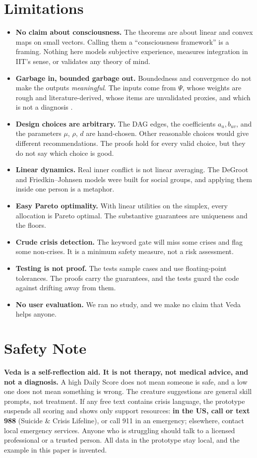 \documentclass[11pt]{article}
\theoremstyle{definition}
\theoremstyle{remark}
\begin{document}
\section{Limitations}\label{sec:limits}
\begin{itemize}
\item \textbf{No claim about consciousness.} The theorems are about linear and convex maps on small vectors. Calling them a ``consciousness framework'' is a framing. Nothing here models subjective experience, measures integration in IIT's sense, or validates any theory of mind.
\item \textbf{Garbage in, bounded garbage out.} Boundedness and convergence do not make the outputs \emph{meaningful}. The inputs come from $\Psi$, whose weights are rough and literature-derived, whose items are unvalidated proxies, and which is not a diagnosis \citep{espinosa2026mindframe}.
\item \textbf{Design choices are arbitrary.} The DAG edges, the coefficients $a_u,b_{uv}$, and the parameters $\mu$, $\rho$, $d$ are hand-chosen. Other reasonable choices would give different recommendations. The proofs hold for every valid choice, but they do not say which choice is good.
\item \textbf{Linear dynamics.} Real inner conflict is not linear averaging. The DeGroot and Friedkin--Johnsen models were built for social groups, and applying them inside one person is a metaphor.
\item \textbf{Easy Pareto optimality.} With linear utilities on the simplex, every allocation is Pareto optimal. The substantive guarantees are uniqueness and the floors.
\item \textbf{Crude crisis detection.} The keyword gate will miss some crises and flag some non-crises. It is a minimum safety measure, not a risk assessment.
\item \textbf{Testing is not proof.} The tests sample cases and use floating-point tolerances. The proofs carry the guarantees, and the tests guard the code against drifting away from them.
\item \textbf{No user evaluation.} We ran no study, and we make no claim that Veda helps anyone.
\end{itemize}

\section{Safety Note}\label{sec:safety}
\textbf{Veda is a self-reflection aid. It is not therapy, not medical advice, and not a diagnosis.} A high Daily Score does not mean someone is safe, and a low one does not mean something is wrong. The creature suggestions are general skill prompts, not treatment. If any free text contains crisis language, the prototype suspends all scoring and shows only support resources: \textbf{in the US, call or text 988} (Suicide \& Crisis Lifeline), or call 911 in an emergency; elsewhere, contact local emergency services. Anyone who is struggling should talk to a licensed professional or a trusted person. All data in the prototype stay local, and the example in this paper is invented.
\end{document}

